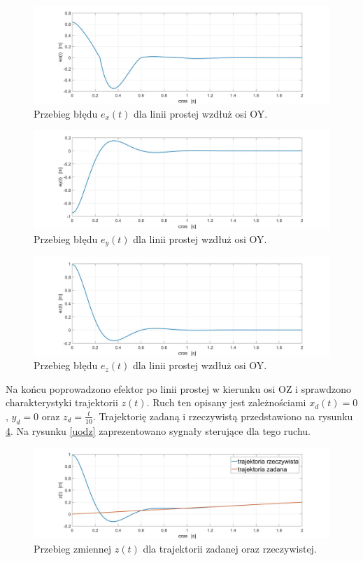 \documentclass[eng,printmode]{mgr}
\begin{document}
\begin{figure}[!h]
\centering
\includegraphics[width=1\textwidth]{exody.jpg}
\caption{\label{exody}Przebieg błędu $e_x(t)$ dla linii prostej wzdłuż osi OY.}
\end{figure}
\begin{figure}[!h]
\centering
\includegraphics[width=1\textwidth]{eyody.jpg}
\caption{\label{eyody}Przebieg błędu $e_y(t)$ dla linii prostej wzdłuż osi OY.}
\end{figure}
\begin{figure}[!h]
\centering
\includegraphics[width=1\textwidth]{ezody.jpg}
\caption{\label{ezody}Przebieg błędu $e_z(t)$ dla linii prostej wzdłuż osi OY.}
\end{figure}
\newpage
Na końcu poprowadzono efektor po linii prostej w kierunku osi OZ i sprawdzono charakterystyki trajektorii $z(t)$. Ruch ten opisany jest zależnościami $x_d(t)=0$, $y_d=0$ oraz $z_d=\frac{t}{10}$.
Trajektorię zadaną i rzeczywistą przedstawiono na rysunku \ref{odz}. Na rysunku \ref{uodz} zaprezentowano sygnały sterujące dla tego ruchu.
\hfill \break
\begin{figure}[!h]
\centering
\includegraphics[width=1\textwidth]{odz.jpg}
\caption{\label{odz}Przebieg zmiennej $z(t)$ dla trajektorii zadanej oraz rzeczywistej.}
\end{figure}
\end{document}
